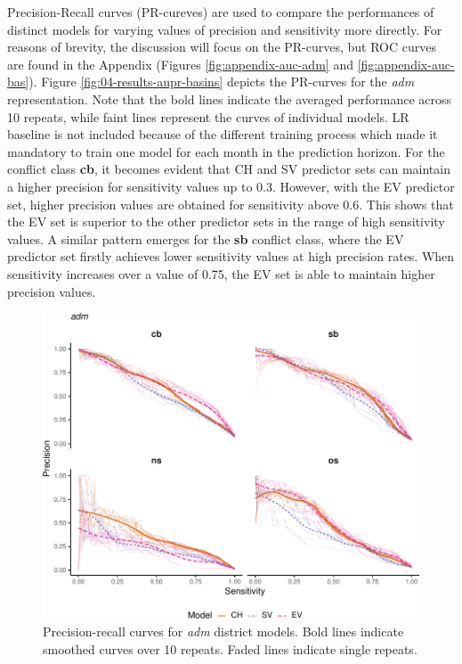 \documentclass[a4paper,11pt]{article}
\begin{document}
Precision-Recall curves (PR-cureves) are used to compare the performances of distinct models
for varying values of precision and sensitivity more directly. For reasons of brevity,
the discussion will focus on the PR-curves, but ROC curves are found in the
Appendix (Figures \ref{fig:appendix-auc-adm} and \ref{fig:appendix-auc-bas}).
Figure \ref{fig:04-results-aupr-basins} depicts the PR-curves for the \emph{adm}
representation. Note that the bold lines indicate the averaged performance
across 10 repeats, while faint lines represent the curves of individual models.
LR baseline is not included because of the different training process which made
it mandatory to train one model for each month in the prediction horizon.
For the conflict class \textbf{cb}, it becomes evident that CH and SV predictor sets can
maintain a higher precision for sensitivity values up to 0.3. However, with
the EV predictor set, higher precision values are obtained for sensitivity above 0.6.
This shows that the EV set is superior to the other predictor sets in the range
of high sensitivity values. A similar pattern emerges for the \textbf{sb} conflict
class, where the EV predictor set firstly achieves lower sensitivity values at
high precision rates. When sensitivity increases over a value of 0.75, the EV set
is able to maintain higher precision values.
\begin{figure}[H]

{\centering \includegraphics{thesis_files/figure-latex/04-results-aupr-states-1} 

}

\caption[Precision-recall curves for \textit{adm} district models.]{Precision-recall curves for \textit{adm} district models. Bold lines indicate smoothed curves over 10 repeats. Faded lines indicate single repeats.}\label{fig:04-results-aupr-states}
\end{figure}
\end{document}
